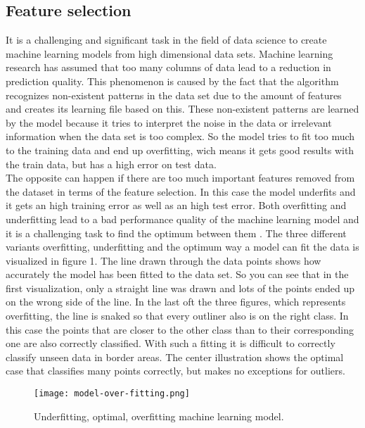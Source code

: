\documentclass[../masterarbeit.tex]{subfiles}
\begin{document}
	



\subsection{Feature selection}

It is a challenging and significant task in the field of data science to create machine learning models from high dimensional data sets. Machine learning research has assumed that too many columns of data lead to a reduction in prediction quality. This phenomenon is caused by the fact that the algorithm recognizes non-existent patterns in the data set due to the amount of features and creates its learning file based on this. These non-existent patterns are learned by the model because it tries to interpret the noise in the data or irrelevant information when the data set is too complex. So the model tries to fit too much to the training data and end up overfitting, wich means it gets good results with the train data, but has a high error on test data. \autocite[]{ibm-overfitting:2022} \\
The opposite can happen if there are too much important features removed from the dataset in terms of the feature selection. In this case the model underfits and it gets an high training error as well as an high test error. \autocite[]{ibm-overfitting:2022}
Both overfitting and underfitting lead to a bad performance quality of the machine learning model and it is a challenging task to find the optimum between them \textcite[]{SUBASI202091}. The three different variants overfitting, underfitting and the optimum way a model can fit the data is visualized in figure 1. The line drawn through the data points shows how accurately the model has been fitted to the data set. So you can see that in the first visualization, only a straight line was drawn and lots of the points ended up on the wrong side of the line. In the last oft the three figures, which represents overfitting, the line is snaked so that every outliner also is on the right class. In this case the points that are closer to the other class than to their corresponding one are also correctly classified. With such a fitting it is difficult to correctly classify unseen data in border areas. The center illustration shows the optimal case that classifies many points correctly, but makes no exceptions for outliers. \\
\begin{figure}[h]
    \centering
    \texttt{[image: model-over-fitting.png]}
    \caption{ Underfitting, optimal, overfitting machine learning model.}
\end{figure} 
\end{document}

